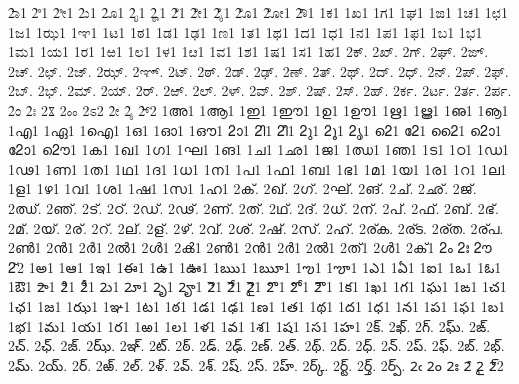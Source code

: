 {2ಾ1
2ಿ1
2ೀ1
2ು1
2ೂ1
2ೃ1
2ೄ1
2ೆ1
2ೇ1
2ೈ1
2ೊ1
2ೋ1
2ೌ1
1ಕ1
1ಖ1
1ಗ1
1ಘ1
1ಙ1
1ಚ1
1ಛ1
1ಜ1
1ಝ1
1ಞ1
1ಟ1
1ಠ1
1ಡ1
1ಢ1
1ಣ1
1ತ1
1ಥ1
1ದ1
1ಧ1
1ನ1
1ಪ1
1ಫ1
1ಬ1
1ಭ1
1ಮ1
1ಯ1
1ರ1
1ಱ1 %
1ಲ1
1ಳ1
1ೞ1 %
1ವ1
1ಶ1
1ಷ1
1ಸ1
1ಹ1
2ಕ್.
2ಖ್.
2ಗ್.
2ಘ್.
2ಙ್.
2ಚ್.
2ಛ್.
2ಜ್.
2ಝ್.
2ಞ್.
2ಟ್.
2ಠ್.
2ಡ್.
2ಢ್.
2ಣ್.
2ತ್.
2ಥ್.
2ದ್.
2ಧ್.
2ನ್.
2ಪ್.
2ಫ್.
2ಬ್.
2ಭ್.
2ಮ್.
2ಯ್.
2ರ್.
2ಱ್. %
2ಲ್.
2ಳ್.
2ವ್.
2ಶ್.
2ಷ್.
2ಸ್.
2ಹ್.
2ರ್ಕ.
2ರ್ಟ.
2ರ್ತ.
2ರ್ಪ.
2ಂ
2ಃ
2ೱ
2ೲ
2ಽ2
2ೕ
2ೖ
2್2
1അ1
1ആ1
1ഇ1
1ഈ1
1ഉ1
1ഊ1
1ഋ1
1ൠ1
1ഌ1
1ൡ1
1എ1
1ഏ1
1ഐ1
1ഒ1
1ഓ1
1ഔ1
2ാ1
2ി1
2ീ1
2ു1
2ൂ1
2ൃ1
2െ1
2േ1
2ൈ1
2ൊ1
2ോ1
2ൌ1
1ക1
1ഖ1
1ഗ1
1ഘ1
1ങ1
1ച1
1ഛ1
1ജ1
1ഝ1
1ഞ1
1ട1
1ഠ1
1ഡ1
1ഢ1
1ണ1
1ത1
1ഥ1
1ദ1
1ധ1
1ന1
1പ1
1ഫ1
1ബ1
1ഭ1
1മ1
1യ1
1ര1
1റ1 %
1ല1
1ള1
1ഴ1 %
1വ1
1ശ1
1ഷ1
1സ1
1ഹ1
2ക്.
2ഖ്.
2ഗ്.
2ഘ്.
2ങ്.
2ച്.
2ഛ്.
2ജ്.
2ഝ്.
2ഞ്.
2ട്.
2ഠ്.
2ഡ്.
2ഢ്.
2ണ്.
2ത്.
2ഥ്.
2ദ്.
2ധ്.
2ന്.
2പ്.
2ഫ്.
2ബ്.
2ഭ്.
2മ്.
2യ്.
2ര്.
2റ്. %
2ല്.
2ള്.
2ഴ്. %
2വ്.
2ശ്.
2ഷ്.
2സ്.
2ഹ്.
2ര്ക.
2ര്ട.
2ര്ത.
2ര്പ.
2ൺ1
2ൻ1
2ർ1
2ൽ1
2ൾ1
2ൿ1
2ണ്‍1
2ന്‍1
2ര്‍1
2ല്‍1
2ത്‍1
2ള്‍1
2ക്‍1
2ം
2ഃ
2ൗ
2്2
1అ1
1ఆ1
1ఇ1
1ఈ1
1ఉ1
1ఊ1
1ఋ1
1ౠ1
1ఌ1
1ౡ1
1ఎ1
1ఏ1
1ఐ1
1ఒ1
1ఓ1
1ఔ1
2ా1
2ి1
2ీ1
2ు1
2ూ1
2ృ1
2ౄ1
2ె1
2ే1
2ై1
2ొ1
2ో1
2ౌ1
1క1
1ఖ1
1గ1
1ఘ1
1ఙ1
1చ1
1ఛ1
1జ1
1ఝ1
1ఞ1
1ట1
1ఠ1
1డ1
1ఢ1
1ణ1
1త1
1థ1
1ద1
1ధ1
1న1
1ప1
1ఫ1
1బ1
1భ1
1మ1
1య1
1ర1
1ఱ1 %
1ల1
1ళ1
1వ1
1శ1
1ష1
1స1
1హ1
2క్.
2ఖ్.
2గ్.
2ఘ్.
2ఙ్.
2చ్.
2ఛ్.
2జ్.
2ఝ్.
2ఞ్.
2ట్.
2ఠ్.
2డ్.
2ఢ్.
2ణ్.
2త్.
2థ్.
2ద్.
2ధ్.
2న్.
2ప్.
2ఫ్.
2బ్.
2భ్.
2మ్.
2య్.
2ర్.
2ఱ్. %
2ల్.
2ళ్.
2వ్.
2శ్.
2ష్.
2స్.
2హ్.
2ర్క్.
2ర్ట్.
2ర్త్.
2ర్ప్.
2ఁ
2ం
2ః
2ౕ
2ౖ
2్2
}
